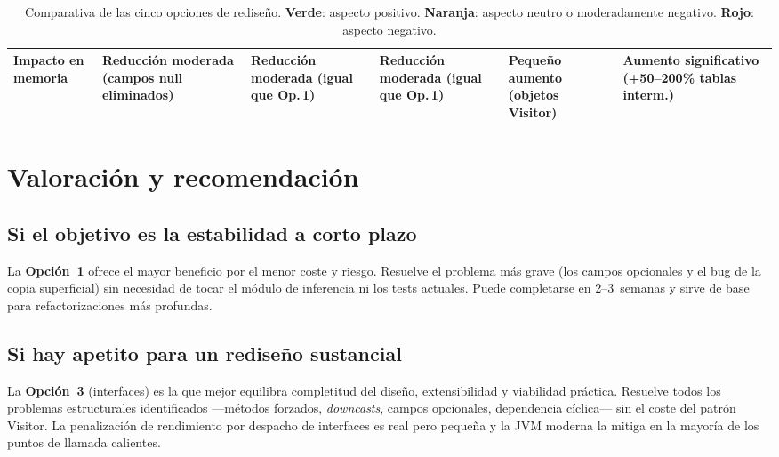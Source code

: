 \documentclass[11pt,a4paper]{article}
\newcommand{\bad}[1]{\textcolor{codered}{\textbf{#1}}}
\newcommand{\good}[1]{\textcolor{codegreen}{\textbf{#1}}}
\newcommand{\warn}[1]{\textcolor{warnorange}{\textbf{#1}}}
\begin{document}
\begin{landscape}
\begin{table}[p]
\begin{tabular}{lp{2.8cm}p{2.8cm}p{2.8cm}p{2.8cm}p{2.8cm}}
\rowcolor{lightgray}
Impacto en memoria
  & \good{Reducción moderada} \newline (campos null eliminados)
  & \good{Reducción moderada} \newline (igual que Op.\,1)
  & \good{Reducción moderada} \newline (igual que Op.\,1)
  & \warn{Pequeño aumento} \newline (objetos Visitor)
  & \bad{Aumento significativo} \newline (+50--200\% tablas interm.) \\

\bottomrule
\end{tabular}
\caption{Comparativa de las cinco opciones de rediseño.  \good{Verde}: aspecto
         positivo.  \warn{Naranja}: aspecto neutro o moderadamente negativo.
         \bad{Rojo}: aspecto negativo.}
\label{tab:comparativa}
\end{table}
\end{landscape}

\section{Valoración y recomendación}

\subsection{Si el objetivo es la estabilidad a corto plazo}

La \textbf{Opción~1} ofrece el mayor beneficio por el menor coste y riesgo.
Resuelve el problema más grave (los campos opcionales y el bug de la copia
superficial) sin necesidad de tocar el módulo de inferencia ni los tests
actuales.  Puede completarse en 2--3~semanas y sirve de base para refactorizaciones
más profundas.

\subsection{Si hay apetito para un rediseño sustancial}

La \textbf{Opción~3} (interfaces) es la que mejor equilibra completitud del
diseño, extensibilidad y viabilidad práctica.  Resuelve todos los problemas
estructurales identificados ---métodos forzados, \emph{downcasts}, campos
opcionales, dependencia cíclica--- sin el coste del patrón Visitor.  La
penalización de rendimiento por despacho de interfaces es real pero pequeña y
la JVM moderna la mitiga en la mayoría de los puntos de llamada calientes.
\end{document}
